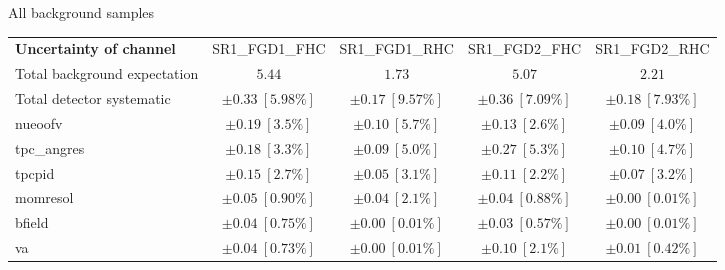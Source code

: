 
\begin{table}
{\large All background samples}
\begin{center}
\setlength{\tabcolsep}{0.0pc}
\begin{tabular*}{\textwidth}{@{\extracolsep{\fill}}lcccc}
\noalign{\smallskip}\hline\noalign{\smallskip}
{\bf Uncertainty of channel}                                    & SR1\_FGD1\_FHC            & SR1\_FGD1\_RHC            & SR1\_FGD2\_FHC            & SR1\_FGD2\_RHC            \\
\noalign{\smallskip}\hline\noalign{\smallskip}
Total background expectation             &  $5.44$        &  $1.73$        &  $5.07$        &  $2.21$       \\
Total detector systematic               & $\pm 0.33\ [5.98\%] $        & $\pm 0.17\ [9.57\%] $        & $\pm 0.36\ [7.09\%] $        & $\pm 0.18\ [7.93\%] $             \\
\noalign{\smallskip}\hline\noalign{\smallskip}
\noalign{\smallskip}\hline\noalign{\smallskip}
nueoofv         & $\pm 0.19\ [3.5\%] $          & $\pm 0.10\ [5.7\%] $          & $\pm 0.13\ [2.6\%] $          & $\pm 0.09\ [4.0\%] $       \\
tpc\_angres         & $\pm 0.18\ [3.3\%] $          & $\pm 0.09\ [5.0\%] $          & $\pm 0.27\ [5.3\%] $          & $\pm 0.10\ [4.7\%] $       \\
tpcpid         & $\pm 0.15\ [2.7\%] $          & $\pm 0.05\ [3.1\%] $          & $\pm 0.11\ [2.2\%] $          & $\pm 0.07\ [3.2\%] $       \\
momresol         & $\pm 0.05\ [0.90\%] $          & $\pm 0.04\ [2.1\%] $          & $\pm 0.04\ [0.88\%] $          & $\pm 0.00\ [0.01\%] $       \\
bfield         & $\pm 0.04\ [0.75\%] $          & $\pm 0.00\ [0.01\%] $          & $\pm 0.03\ [0.57\%] $          & $\pm 0.00\ [0.01\%] $       \\
va         & $\pm 0.04\ [0.73\%] $          & $\pm 0.00\ [0.01\%] $          & $\pm 0.10\ [2.1\%] $          & $\pm 0.01\ [0.42\%] $       \\

\end{tabular*}
\end{center}
\end{table}
